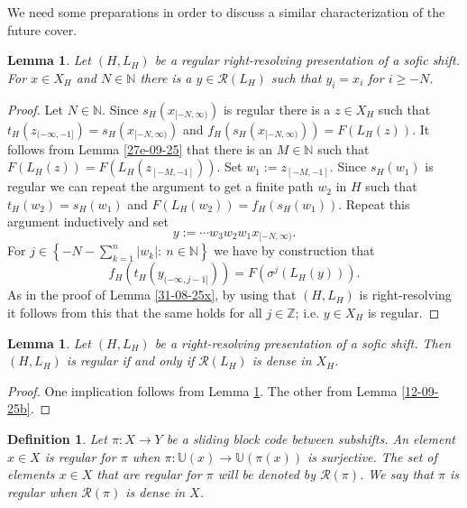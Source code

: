 \documentclass[12pt,oneside,english]{amsart}
\newtheorem{lemma}[thm]{Lemma}
\newtheorem{definition}[thm]{Definition}
\begin{document}
We need some preparations in order to discuss a similar characterization of the future cover.


\begin{lemma}\label{17-11-25g} Let $(H,L_H)$ be a regular right-resolving presentation of a sofic shift. For $x \in X_H$ and $N \in \mathbb N$ there is a $y \in \mathcal R(L_H)$ such that $y_i = x_i$ for $i \geq -N$. 
\end{lemma}
\begin{proof} Let $N \in \mathbb N$. Since $s_H(x_{[-N,\infty)})$ is regular there is a $z \in X_H$ such that $t_H(z_{(-\infty,-1]}) = s_H(x_{[-N,\infty)})$ and $f_H(s_H(x_{[-N,\infty)})) = F(L_H(z))$. It follows from Lemma \ref{27e-09-25} that there is an $M \in \mathbb N$ such that $F(L_H(z)) = F(L_H(z_{[-M,-1]}))$. Set $w_1 :=z_{[-M,-1]}$. Since $s_H(w_1)$ is regular we can repeat the argument to get a finite path $w_2$ in $H$ such that $t_H(w_2) = s_H(w_1)$ and $F(L_H(w_2)) = f_H(s_H(w_1))$. Repeat this argument inductively and set
$$
y := \cdots w_3w_2w_1x_{[-N,\infty)} .
$$
For $j \in \left\{-N-\sum_{k =1}^n|w_k|: \ n \in \mathbb N\right\}$ we have by construction that
$$
f_H(t_H(y_{(-\infty,j-1]})) = F(\sigma^j(L_H(y))) .
$$
As in the proof of Lemma \ref{31-08-25x}, by using that $(H,L_H)$ is right-resolving it follows from this that the same holds for all $j \in \mathbb Z$; i.e. $y\in X_H$ is regular.  
\end{proof}

\begin{lemma}\label{17-11-25h} Let $(H,L_H)$ be a right-resolving presentation of a sofic shift. Then $(H,L_H)$ is regular if and only if $\mathcal R(L_H)$ is dense in $X_H$.
\end{lemma}
\begin{proof} One implication follows from Lemma \ref{17-11-25g}. The other from Lemma \ref{12-09-25b}.
\end{proof}


\begin{definition}\label{18-11-25} Let $\pi : X \to Y$ be a sliding block code between subshifts. An element $x \in X$ is \emph{regular} for $\pi$ when $\pi : \mathbb U(x) \to \mathbb U(\pi(x))$ is surjective. The set of 
elements $x \in X$ that are regular for $\pi$ will be denoted by $\mathcal R(\pi)$. We say that $\pi$ is \emph{regular} when $\mathcal R(\pi)$ is dense in $X$. 
\end{definition}
\end{document}

